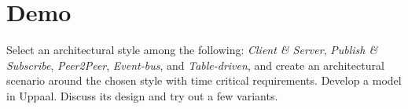 \documentclass[11pt]{article}
\begin{document}
\section*{Demo}


\begin{exercise}  
Select an architectural style among the following: \emph{Client \& Server}, \emph{Publish \& Subscribe}, \emph{Peer2Peer}, \emph{Event-bus}, and \emph{Table-driven}, and create an architectural scenario around the chosen style with time critical requirements. Develop a model in Uppaal. Discuss its design and try out a few variants.
\end{exercise}


 
\end{document}
